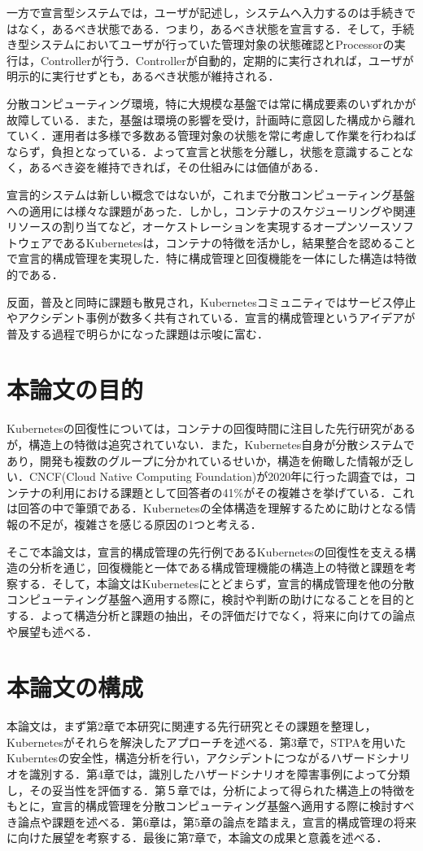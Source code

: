\documentclass[12pt,a4j]{ujreport}
\begin{document}
一方で宣言型システムでは，ユーザが記述し，システムへ入力するのは手続きではなく，あるべき状態である．つまり，あるべき状態を宣言する．そして，手続き型システムにおいてユーザが行っていた管理対象の状態確認とProcessorの実行は，Controllerが行う．Controllerが自動的，定期的に実行されれば，ユーザが明示的に実行せずとも，あるべき状態が維持される．

分散コンピューティング環境，特に大規模な基盤では常に構成要素のいずれかが故障している．また，基盤は環境の影響を受け，計画時に意図した構成から離れていく．運用者は多様で多数ある管理対象の状態を常に考慮して作業を行わねばならず，負担となっている．よって宣言と状態を分離し，状態を意識することなく，あるべき姿を維持できれば，その仕組みには価値がある．

宣言的システムは新しい概念ではないが，これまで分散コンピューティング基盤への適用には様々な課題があった．しかし，コンテナのスケジューリングや関連リソースの割り当てなど，オーケストレーションを実現するオープンソースソフトウェアであるKubernetes\cite{ref5}は，コンテナの特徴を活かし，結果整合を認めることで宣言的構成管理を実現した．特に構成管理と回復機能を一体にした構造は特徴的である．

反面，普及と同時に課題も散見され，Kubernetesコミュニティではサービス停止やアクシデント事例が数多く共有されている\cite{ref6}．宣言的構成管理というアイデアが普及する過程で明らかになった課題は示唆に富む．

\section{本論文の目的}
Kubernetesの回復性については，コンテナの回復時間に注目した先行研究\cite{ref7}があるが，構造上の特徴は追究されていない．また，Kubernetes自身が分散システムであり，開発も複数のグループに分かれているせいか，構造を俯瞰した情報が乏しい．CNCF(Cloud Native Computing Foundation)が2020年に行った調査\cite{ref8}では，コンテナの利用における課題として回答者の41\%がその複雑さを挙げている．これは回答の中で筆頭である．Kubernetesの全体構造を理解するために助けとなる情報の不足が，複雑さを感じる原因の1つと考える．

そこで本論文は，宣言的構成管理の先行例であるKubernetesの回復性を支える構造の分析を通じ，回復機能と一体である構成管理機能の構造上の特徴と課題を考察する．そして，本論文はKubernetesにとどまらず，宣言的構成管理を他の分散コンピューティング基盤へ適用する際に，検討や判断の助けになることを目的とする．よって構造分析と課題の抽出，その評価だけでなく，将来に向けての論点や展望も述べる．

\section{本論文の構成}
本論文は，まず第2章で本研究に関連する先行研究とその課題を整理し，Kubernetesがそれらを解決したアプローチを述べる．第3章で，STPAを用いたKuberntesの安全性，構造分析を行い，アクシデントにつながるハザードシナリオを識別する．第4章では，識別したハザードシナリオを障害事例によって分類し，その妥当性を評価する．第５章では，分析によって得られた構造上の特徴をもとに，宣言的構成管理を分散コンピューティング基盤へ適用する際に検討すべき論点や課題を述べる．第6章は，第5章の論点を踏まえ，宣言的構成管理の将来に向けた展望を考察する．最後に第7章で，本論文の成果と意義を述べる．
\end{document}
